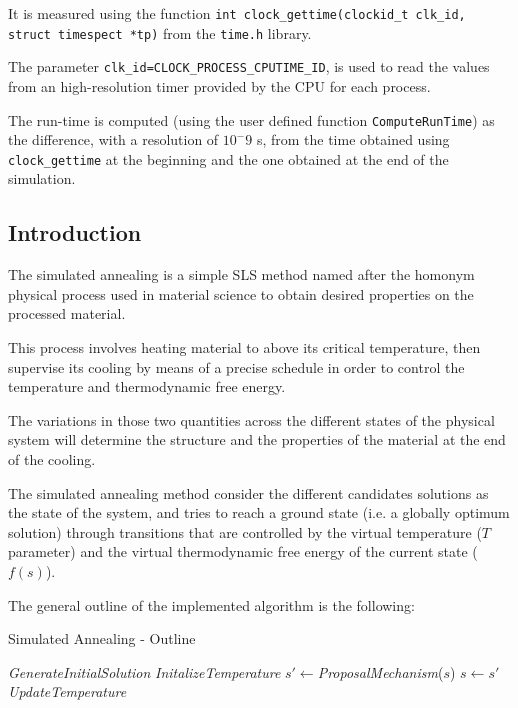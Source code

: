 \begin{homeworkProblem}
It is measured using the function \verb|int clock_gettime(clockid_t clk_id, struct timespect *tp)| from the \verb|time.h| library.

The parameter \verb|clk_id=CLOCK_PROCESS_CPUTIME_ID|, is used to read the values from an high-resolution timer provided by the CPU for each process.

The run-time is computed (using the user defined function \verb|ComputeRunTime|) as the difference, with a resolution of $10^-9$ s, from the time obtained using \verb|clock_gettime| at the beginning and the one obtained at the end of the simulation.

\subsection{Introduction} \label{sec:introSA}
The simulated annealing is a simple SLS method named after the homonym physical process used in material science to obtain desired properties on the processed material.

This process involves heating material to above its critical temperature, then supervise its cooling by means of a precise schedule in order to control the temperature and thermodynamic free energy.

The variations in those two quantities across the different states of the physical system will determine the structure and the properties of the material at the end of the cooling.

The simulated annealing method consider the different candidates solutions as the state of the system, and tries to reach a ground state (i.e. a globally optimum solution) through transitions that are controlled by the virtual temperature ($T$ parameter) and the virtual thermodynamic free energy of the current state ($f(s)$).

The general outline of the implemented algorithm is the following: 

\begin{algorithm}[!h]
  \caption{Simulated Annealing - Outline}\label{aco}
  \begin{algorithmic}[1]
    \State \emph{GenerateInitialSolution}
    \State \emph{InitalizeTemperature} 
        \State $s' \gets $\emph{ProposalMechanism}($s$)
          \State $s \gets s'$
        \EndIf
        \State \emph{UpdateTemperature}
    \EndWhile
\end{algorithmic}
\end{algorithm}


\end{homeworkProblem}
